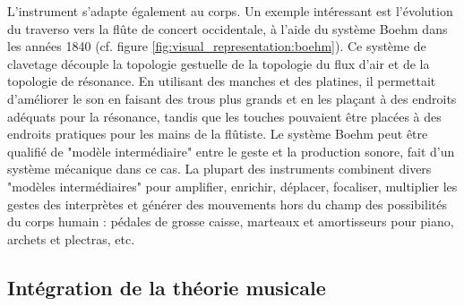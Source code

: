 L'instrument s'adapte également au corps. Un exemple intéressant est l'évolution du traverso vers la flûte de concert occidentale, à l'aide du système Boehm dans les années 1840 (cf. figure \ref{fig:visual_representation:boehm}). Ce système de clavetage découple la topologie gestuelle de la topologie du flux d'air et de la topologie de résonance. En utilisant des manches et des platines, il permettait d'améliorer le son en faisant des trous plus grands et en les plaçant à des endroits adéquats pour la résonance, tandis que les touches pouvaient être placées à des endroits pratiques pour les mains de la flûtiste.
Le système Boehm peut être qualifié de "modèle intermédiaire" entre le geste et la production sonore, fait d'un système mécanique dans ce cas. La plupart des instruments combinent divers "modèles intermédiaires" pour amplifier, enrichir, déplacer, focaliser, multiplier les gestes des interprètes et générer des mouvements hors du champ des possibilités du corps humain : pédales de grosse caisse, marteaux et amortisseurs pour piano, archets et plectras, etc.

\subsection{Intégration de la théorie musicale}

